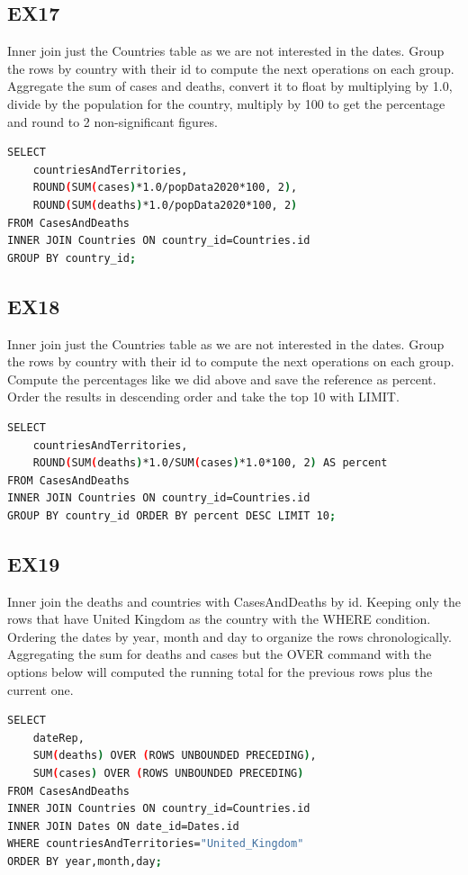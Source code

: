 \documentclass[12pt,oneside,a4paper,english]{article}
\begin{document}
\pagebreak
\subsection{EX17}
\noindent Inner join just the Countries table as we are not interested in the dates. Group the rows by country with their id to compute the next operations on each group. Aggregate the sum of cases and deaths, convert it to float by multiplying by 1.0, divide by the population for the country, multiply by 100 to get the percentage and round to 2 non-significant figures.
\begin{lstlisting}[language=Bash]
SELECT	
	countriesAndTerritories,
	ROUND(SUM(cases)*1.0/popData2020*100, 2),
	ROUND(SUM(deaths)*1.0/popData2020*100, 2)
FROM CasesAndDeaths
INNER JOIN Countries ON country_id=Countries.id
GROUP BY country_id;
\end{lstlisting}

\subsection{EX18}
\noindent Inner join just the Countries table as we are not interested in the dates. Group the rows by country with their id to compute the next operations on each group. Compute the percentages like we did above and save the reference as percent. Order the results in descending order and take the top 10 with LIMIT.
\begin{lstlisting}[language=Bash]
SELECT
	countriesAndTerritories,
	ROUND(SUM(deaths)*1.0/SUM(cases)*1.0*100, 2) AS percent
FROM CasesAndDeaths
INNER JOIN Countries ON country_id=Countries.id
GROUP BY country_id ORDER BY percent DESC LIMIT 10;
\end{lstlisting}

\subsection{EX19}
\noindent Inner join the deaths and countries with CasesAndDeaths by id. Keeping only the rows that have United Kingdom as the country with the WHERE condition. Ordering the dates by year, month and day to organize the rows chronologically. Aggregating the sum for deaths and cases but the OVER command with the options below will computed the running total for the previous rows plus the current one. 
\begin{lstlisting}[language=Bash]
SELECT
	dateRep,
	SUM(deaths) OVER (ROWS UNBOUNDED PRECEDING),
	SUM(cases) OVER (ROWS UNBOUNDED PRECEDING)
FROM CasesAndDeaths
INNER JOIN Countries ON country_id=Countries.id
INNER JOIN Dates ON date_id=Dates.id
WHERE countriesAndTerritories="United_Kingdom"
ORDER BY year,month,day;
\end{lstlisting}
\end{document}
